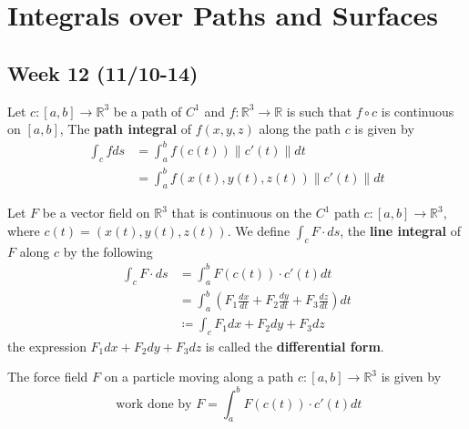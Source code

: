 \documentclass[openany]{book}
\newcommand{\R}{\mathbb{R}}
\begin{document}
\chapter{Integrals over Paths and Surfaces}
\section*{\centering Week 12 (11/10-14)}









\begin{defn}
    Let $c:[a,b]\to\R^3$ be a path of $C^1$ and $f:\R^3\to\R$ is such that $f\circ c$ is continuous on $[a,b]$, The \textbf{path integral} of $f(x,y,z)$ along the path $c$ is given by 
    \begin{align*}
        \int_c fds&=\int_a^bf(c(t))\|c'(t)\|dt\\
        &=\int_a^bf(x(t),y(t), z(t))\|c'(t)\|dt
    \end{align*}
\end{defn}



\begin{defn}
    Let $F$ be a vector field on $\R^3$ that is continuous on the $C^1$ path $c:[a,b]\to\R^3$, where $c(t)=(x(t), y(t), z(t))$. We define $\int_c F\cdot ds$, the \textbf{line integral} of $F$ along $c$ by the following
    \begin{align*}
        \int_c F\cdot ds&=\int_a^bF(c(t))\cdot c'(t)dt\\
        &=\int_a^b \left(F_1\frac{dx}{dt}+F_2\frac{dy}{dt}+F_3\frac{dz}{dt}\right)dt\\
        &\coloneq\int_c F_1dx+F_2dy+F_3dz
    \end{align*}
    the expression $F_1dx+F_2dy+F_3dz$ is called the \textbf{differential form}.
\end{defn}


\begin{example}
    The force field $F$ on a particle moving along a path $c:[a,b]\to\R^3$ is given by 
    \begin{equation*}
        \text{ work done by } F=\int_a^bF(c(t))\cdot c'(t)dt
    \end{equation*}
\end{example}
\end{document}
